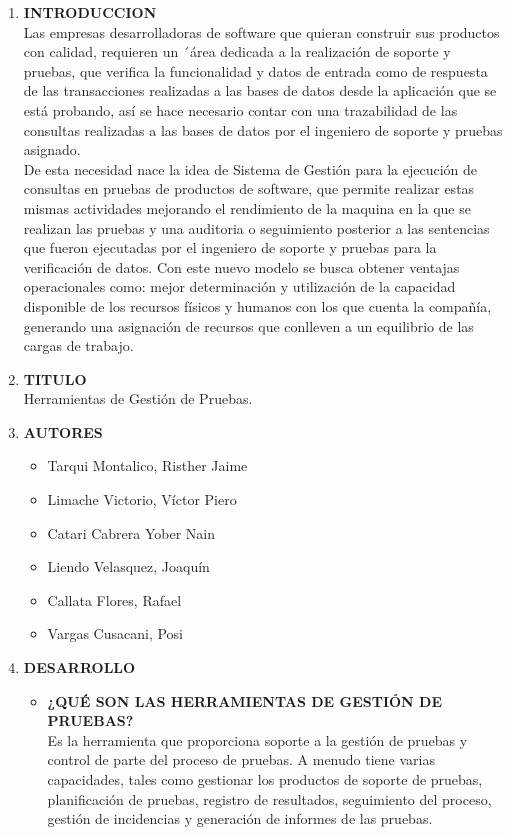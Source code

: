 \documentclass[12pt,a4paper,oneside]{book}
\begin{document}
	\begin{enumerate}
		\item \textbf{INTRODUCCION} \\
			Las empresas desarrolladoras de software que quieran construir sus productos con calidad, requieren un ´área dedicada a la realización de soporte y pruebas, que verifica la funcionalidad y datos de entrada como de respuesta de las transacciones realizadas a las bases de datos desde la aplicación que se está probando, así se hace necesario contar con una trazabilidad de las consultas realizadas a las bases de datos por el ingeniero de soporte y pruebas asignado. \\
			
			De esta necesidad nace la idea de Sistema de Gestión para la ejecución de consultas en pruebas de productos de software, que permite realizar estas mismas actividades mejorando el rendimiento de la maquina en la que se realizan las pruebas y una auditoria o seguimiento posterior a las sentencias que fueron ejecutadas por el ingeniero de soporte y pruebas para la verificación de datos. Con este nuevo modelo se busca obtener ventajas operacionales como: mejor determinación y utilización de la capacidad disponible de los recursos físicos y humanos con los que cuenta la compañía, generando una asignación de recursos que conlleven a un equilibrio de las cargas de trabajo.\\
			
		\item \textbf{TITULO} \\
			Herramientas de Gestión de Pruebas. \\
		\item \textbf{AUTORES}
			\begin{itemize}
				 \item Tarqui Montalico, Risther Jaime 
				 \item Limache Victorio, V\'ictor Piero 
				 \item Catari Cabrera Yober Nain 
				 
				 \item Liendo Velasquez, Joaqu\'in 
				 \item Callata Flores, Rafael 
				 \item Vargas Cusacani, Posi 
			\end{itemize}
		\item \textbf{DESARROLLO}
			\begin{itemize}
				\item \textbf{¿QUÉ SON LAS HERRAMIENTAS DE GESTIÓN DE PRUEBAS?}\\
					Es la herramienta que proporciona soporte a la gestión de pruebas y control de parte del proceso de pruebas. A menudo tiene varias capacidades, tales como gestionar los productos de soporte de pruebas, planificación de pruebas, registro de resultados, seguimiento del proceso, gestión de incidencias y generación de informes de las pruebas.\\
					

\end{itemize}
\end{enumerate}
\end{document}
